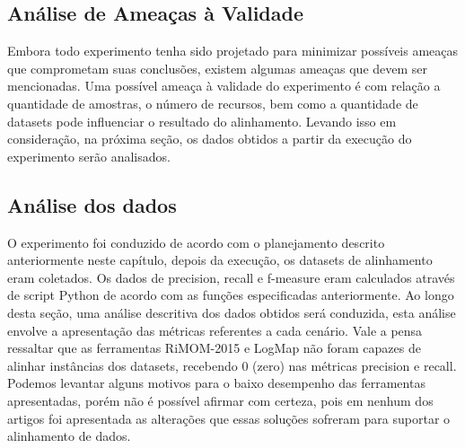 \subsection{Análise de Ameaças à Validade}
Embora todo experimento tenha sido projetado para minimizar possíveis ameaças que comprometam suas conclusões, existem algumas ameaças que devem ser mencionadas. Uma possível ameaça à validade do experimento é com relação a quantidade de amostras, o número de recursos, bem como a quantidade de datasets pode influenciar o resultado do alinhamento.
Levando isso em consideração, na próxima seção, os dados obtidos a partir da execução do experimento serão analisados.

\subsection{Análise dos dados}
O experimento foi conduzido de acordo com o planejamento descrito anteriormente neste capítulo, depois da execução, os datasets de alinhamento eram coletados. Os dados de precision, recall e f-measure eram calculados através de script Python de acordo com as funções especificadas anteriormente.
Ao longo desta seção, uma análise descritiva dos dados obtidos será conduzida, esta análise envolve a apresentação das métricas referentes a cada cenário. Vale a pensa ressaltar que as ferramentas RiMOM-2015 e LogMap não foram capazes de alinhar instâncias dos datasets, recebendo 0 (zero) nas métricas precision e recall. Podemos levantar alguns motivos para o baixo desempenho das ferramentas apresentadas, porém não é possível afirmar com certeza, pois em nenhum dos artigos foi apresentada as alterações que essas soluções sofreram para suportar o alinhamento de dados.

